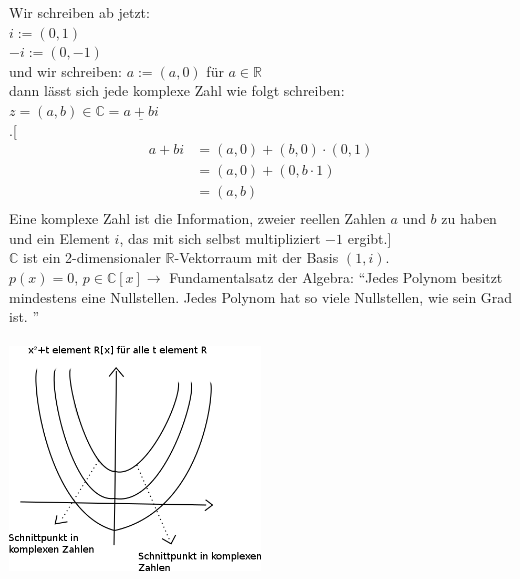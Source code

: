Wir schreiben ab jetzt:\\
$i:=(0,1)$\\
$-i:=(0,-1)$\\
und wir schreiben: $a:=(a,0)$ für $a\in\mathbb{R}$\\
dann lässt sich jede komplexe Zahl wie folgt schreiben:\\
$z=(a,b)\in\mathbb{C}=\underline{a+bi}$\\
.[ 
\begin{align}
a+bi &= (a,0)+(b,0)\cdot(0,1)\\
&= (a,0)+(0,b\cdot1)\\
&= (a,b)\\
\end{align}
Eine komplexe Zahl ist die Information, zweier reellen Zahlen $a$ und $b$ zu haben und ein Element $i$, das mit sich selbst multipliziert $-1$ ergibt.\quad ]\\
$\mathbb{C}$ ist ein 2-dimensionaler $\mathbb{R}$-Vektorraum mit der Basis $(1,i)$.\\
$p(x)=0, \, p\in \mathbb{C}[x] \rightarrow$ Fundamentalsatz der Algebra: "`Jedes Polynom besitzt mindestens eine Nullstellen. Jedes Polynom hat so viele Nullstellen, wie sein Grad ist. "'\\
\qquad\\
\includegraphics[width=0.5\textwidth]{mainmatter/chapter3/pics/komplexkoord.png}
%
%
%
